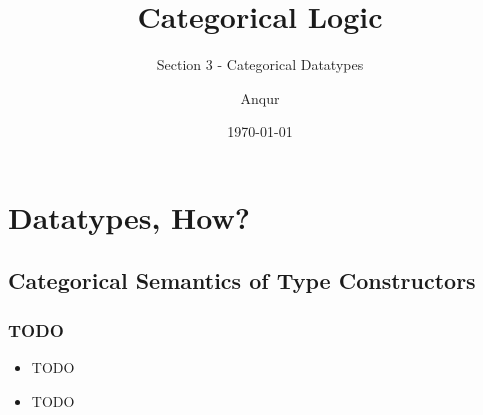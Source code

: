 \documentclass{beamer}
\title{Categorical Logic}
\subtitle{Section 3 - Categorical Datatypes}
\author{Anqur}
\date{\today}
\begin{document}
\frame{\titlepage}

\section[Outline]{}
\frame{\tableofcontents}

\section{Datatypes, How?}
\subsection{Categorical Semantics of Type Constructors}

\frame
{
  \frametitle{TODO}

  \begin{itemize}
    \item<1-> TODO
    \item<2-> TODO
  \end{itemize}
}
\end{document}
